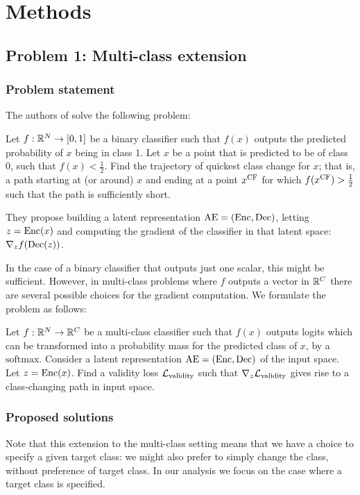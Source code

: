 \documentclass[../main.tex]{subfiles}
\begin{document}
\chapter{Methods}
\label{ch:methods}

\section{Problem 1: Multi-class extension}

\subsection{Problem statement}

The authors of \ls{} solve the following problem:

Let $f: \mathbb{R}^N \to [0, 1]$ be a binary classifier such that $f(x)$ outputs the predicted probability of $x$ being in class 1.
Let $x$ be a point that is predicted to be of class 0, \ie{} such that $f(x) < \frac{1}{2}$.
Find the trajectory of quickest class change for $x$; that is, a path starting at (or around) $x$ and ending at a point $x^\text{CF}$ for which $f(x^\text{CF}) > \frac{1}{2}$ such that the path is sufficiently short.

They propose building a latent representation $\mathrm{AE} = (\operatorname{Enc}, \operatorname{Dec})$, letting $z = \operatorname{Enc}(x)$ and computing the gradient of the classifier in that latent space:
$\nabla_z f(\operatorname{Dec}(z))$.

In the case of a binary classifier that outputs just one scalar, this might be sufficient. However, in multi-class problems where $f$ outputs a vector in $\mathbb{R}^C$ there are several possible choices for the gradient computation.
We formulate the problem as follows:

Let $f: \mathbb{R}^N \to \mathbb{R}^C$ be a multi-class classifier such that $f(x)$ outputs logits which can be transformed into a probability mass for the predicted class of $x$, \eg{} by a $\mathrm{softmax}$.
Consider a latent representation $\mathrm{AE} = (\operatorname{Enc}, \operatorname{Dec})$ of the input space. 
Let $z = \operatorname{Enc}(x)$.
Find a validity loss $\mathcal{L}_\text{validity}$ such that
$\nabla_z \mathcal{L}_\text{validity}$ gives rise to a class-changing path in input space.

\subsection{Proposed solutions}

Note that this extension to the multi-class setting means that we have a choice to specify a given target class: we might also prefer to simply change the class, without preference of target class. In our analysis we focus on the case where a target class is specified.
\end{document}
